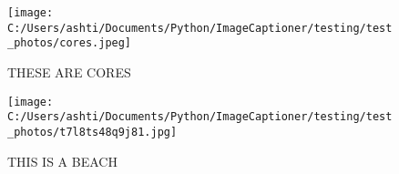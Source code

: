 \documentclass{article}%
\begin{document}
%
\normalsize%


\begin{figure}[h]%
\centering%
\texttt{[image: C:/Users/ashti/Documents/Python/ImageCaptioner/testing/test\_photos/cores.jpeg]}%
\caption{THESE ARE CORES}%
\end{figure}

%


\begin{figure}[h]%
\centering%
\texttt{[image: C:/Users/ashti/Documents/Python/ImageCaptioner/testing/test\_photos/t7l8ts48q9j81.jpg]}%
\caption{THIS IS A BEACH}%
\end{figure}

%
\end{document}
